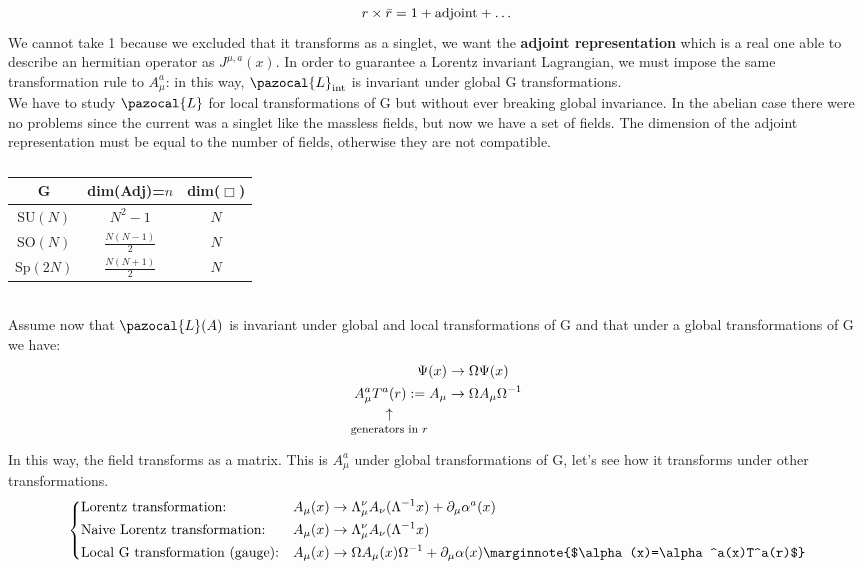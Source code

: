\documentclass[../main.tex]{subfiles}
\begin{document}
\[
r\times\Bar{r}=1+\text{adjoint}+\dots
\]
We cannot take 1 because we excluded that it transforms as a singlet, we want the \textbf{adjoint representation} which is a real one able to describe an hermitian operator as $J^{\mu,a}(x)$. In order to guarantee a Lorentz invariant Lagrangian, we must impose the same transformation rule to $A_\mu^a$: in this way, $\pazocal{L}_{\text{int}}$ is invariant under global G transformations.\\
We have to study $\pazocal{L}$ for local transformations of G but without ever breaking global invariance. In the abelian case there were no problems since the current was a singlet like the massless fields, but now we have a set of fields. The dimension of the adjoint representation must be equal to the number of fields, otherwise they are not compatible.
\begin{table}[h]
    \centering
    \begin{tabular}{ccc}
    G & dim(Adj)=$n$ & dim($\Box$) \\
    \hline
    SU$(N)$ & $N^2-1$ & $N$ \\
    SO$(N)$ & $\frac{N(N-1)}{2}$ & $N$ \\
    Sp$(2N)$ & $\frac{N(N+1)}{2}$ & $N$ \\
    \hline
    \end{tabular}
    \caption*{}
    \label{tab:my_label}
\end{table}\\
Assume now that $\pazocal{L}(A)$ is invariant under global and local transformations of G and that under a global transformations of G we have:
\begin{align*}
\Psi(x)&\to\Omega\Psi(x)\\
A_\mu^a\underset{\mathclap{\tikz \node {$\uparrow$} node [below=1ex] {\footnotesize  generators in $r$};}}{T^a(r)}:=A_\mu&\to\Omega A_\mu\Omega^{-1}
\end{align*}
In this way, the field transforms as a matrix. This is $A_\mu^a$ under global transformations of G, let's see how it transforms under other transformations.
\[
\left\{
\begin{aligned}
&\text{Lorentz transformation:} &&A_\mu(x)\to\Lambda_\mu^\nu A_\nu(\Lambda^{-1}x)+\partial_\mu\alpha^a(x)\\
&\text{Naive Lorentz transformation:} &&A_\mu(x)\to\Lambda_\mu^\nu A_\nu(\Lambda^{-1}x)\\
&\text{Local G transformation (gauge):} &&A_\mu(x)\to\Omega A_\mu(x)\Omega^{-1}+\partial_\mu\alpha(x)\marginnote{$\alpha(x)=\alpha^a(x)T^a(r)$}
\end{aligned}
\right.
\]
\end{document}
